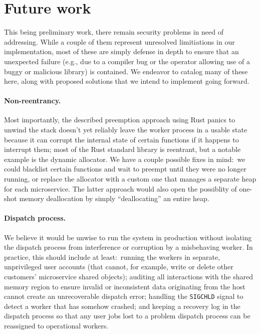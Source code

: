 \section{Future work}
\label{sec:future}

This being preliminary work, there remain security problems in need of addressing.
While a couple of them represent unresolved limitiations in our implementation, most
of these are simply defense in depth to ensure that an unexpected failure (e.g., due
to a compiler bug or the operator allowing use of a buggy or malicious library) is
contained.  We endeavor to catalog many of these here, along with proposed solutions
that we intend to implement going forward.

\paragraph{Non-reentrancy.}
Most importantly, the described preemption approach using Rust panics to unwind the
stack doesn't yet reliably leave the worker process in a usable state because it
can corrupt the internal state of certain functions if it happens to interrupt them;
most of the Rust standard library is reentrant, but a notable example is the dynamic
allocator.  We have a couple possible fixes in mind:\ we could blacklist certain
functions and wait to preempt until they were no longer running, or replace the
allocator with a custom one that manages a separate heap for each microservice.  The
latter approach would also open the possiblity of one-shot memory deallocation by
simply ``deallocating'' an entire heap.

\paragraph{Dispatch process.}
We believe it would be unwise to run the system in production without isolating the
dispatch process from interference or corruption by a misbehaving worker.  In
practice, this should include at least:\ running the workers in separate,
unprivileged user accounts (that cannot, for example, write or delete other
customers' microservice shared objects); auditing all interactions with the shared
memory region to ensure invalid or inconsistent data originating from the host cannot
create an unrecoverable dispatch error; handling the \texttt{SIGCHLD} signal to
detect a worker that has somehow crashed; and keeping a recovery log in the dispatch
process so that any user jobs lost to a problem dispatch process can be reassigned to
operational workers.


